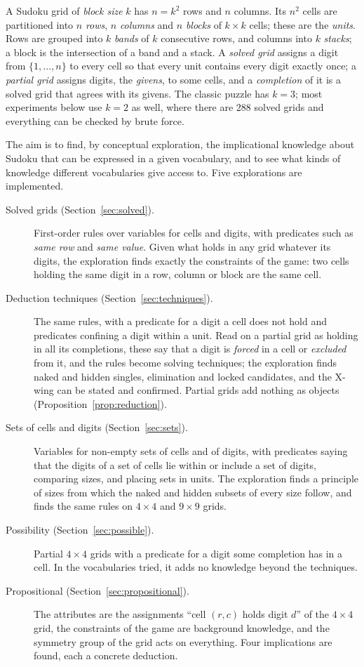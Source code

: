 \documentclass[11pt,a4paper]{article}
\theoremstyle{definition}
\theoremstyle{remark}
\begin{document}
A Sudoku grid of \emph{block size} $k$ has $n = k^2$ rows and $n$ columns. Its $n^2$ cells are partitioned into $n$ \emph{rows}, $n$ \emph{columns} and $n$ \emph{blocks} of $k \times k$ cells; these are the \emph{units}. Rows are grouped into $k$ \emph{bands} of $k$ consecutive rows, and columns into $k$ \emph{stacks}; a block is the intersection of a band and a stack. A \emph{solved grid} assigns a digit from $\{1, \dots, n\}$ to every cell so that every unit contains every digit exactly once; a \emph{partial grid} assigns digits, the \emph{givens}, to some cells, and a \emph{completion} of it is a solved grid that agrees with its givens. The classic puzzle has $k = 3$; most experiments below use $k = 2$ as well, where there are $288$ solved grids and everything can be checked by brute force.

The aim is to find, by conceptual exploration, the implicational knowledge about Sudoku that can be expressed in a given vocabulary, and to see what kinds of knowledge different vocabularies give access to. Five explorations are implemented.
\begin{description}
  \item[Solved grids (Section~\ref{sec:solved}).] First-order rules over variables for cells and digits, with predicates such as \emph{same row} and \emph{same value}. Given what holds in any grid whatever its digits, the exploration finds exactly the constraints of the game: two cells holding the same digit in a row, column or block are the same cell.
  \item[Deduction techniques (Section~\ref{sec:techniques}).] The same rules, with a predicate for a digit a cell does not hold and predicates confining a digit within a unit. Read on a partial grid as holding in all its completions, these say that a digit is \emph{forced} in a cell or \emph{excluded} from it, and the rules become solving techniques; the exploration finds naked and hidden singles, elimination and locked candidates, and the X-wing can be stated and confirmed. Partial grids add nothing as objects (Proposition~\ref{prop:reduction}).
  \item[Sets of cells and digits (Section~\ref{sec:sets}).] Variables for non-empty sets of cells and of digits, with predicates saying that the digits of a set of cells lie within or include a set of digits, comparing sizes, and placing sets in units. The exploration finds a principle of sizes from which the naked and hidden subsets of every size follow, and finds the same rules on $4 \times 4$ and $9 \times 9$ grids.
  \item[Possibility (Section~\ref{sec:possible}).] Partial $4 \times 4$ grids with a predicate for a digit some completion has in a cell. In the vocabularies tried, it adds no knowledge beyond the techniques.
  \item[Propositional (Section~\ref{sec:propositional}).] The attributes are the assignments ``cell $(r,c)$ holds digit $d$'' of the $4 \times 4$ grid, the constraints of the game are background knowledge, and the symmetry group of the grid acts on everything. Four implications are found, each a concrete deduction.
\end{description}
\end{document}
